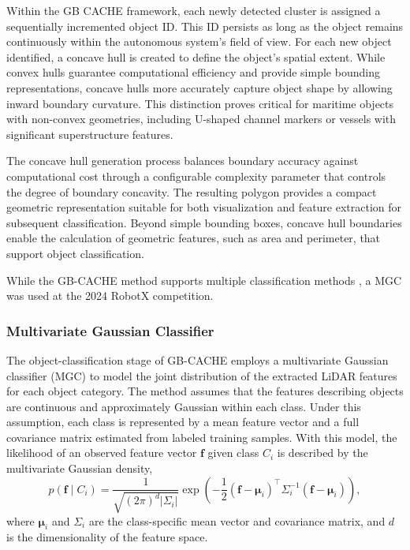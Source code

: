 \documentclass{erauthesis}
\begin{document}
Within the GB CACHE framework, each newly detected cluster is assigned a sequentially incremented object ID. 
This ID persists as long as the object remains continuously within the autonomous system's field of view.
For each new object identified, a concave hull is created to define the object's spatial extent. 
While convex hulls guarantee computational efficiency and provide simple bounding representations, concave hulls more accurately capture object shape by allowing inward boundary curvature. 
This distinction proves critical for maritime objects with non-convex geometries, including U-shaped channel markers or vessels with significant superstructure features.

The concave hull generation process balances boundary accuracy against computational cost through a configurable complexity parameter that controls the degree of boundary concavity. 
The resulting polygon provides a compact geometric representation suitable for both visualization and feature extraction for subsequent classification. 
Beyond simple bounding boxes, concave hull boundaries enable the calculation of geometric features, such as area and perimeter, that support object classification. 


While the GB-CACHE method supports multiple classification methods \cite{coyleE, thompson2017}, a \ac{MGC} was used at the 2024 RobotX competition. 

\subsubsection{Multivariate Gaussian Classifier} \label{gbcache_mgc}
The object-classification stage of GB-CACHE employs a multivariate Gaussian classifier (MGC) to model the joint distribution of the extracted LiDAR features for each object category. The method assumes that the features describing objects are continuous and approximately Gaussian within each class. 
Under this assumption, each class is represented by a mean feature vector and a full covariance matrix estimated from labeled training samples. 
With this model, the likelihood of an observed feature vector $\mathbf{f}$ given class $C_i$ is described by the multivariate Gaussian density,
\begin{equation}
p\left(\mathbf{f} \mid C_i\right)=\frac{1}{\sqrt{(2 \pi)^d\left|\Sigma_i\right|}} \exp \left(-\frac{1}{2}\left(\mathbf{f}-\boldsymbol{\mu}_i\right)^{\top} \Sigma_i^{-1}\left(\mathbf{f}-\boldsymbol{\mu}_i\right)\right),
\end{equation}
where $\boldsymbol{\mu}_i$ and $\Sigma_i$ are the class-specific mean vector and covariance matrix, and $d$ is the dimensionality of the feature space.
\end{document}

